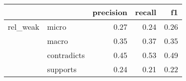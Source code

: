 \begin{tabular}{llrrr}
\toprule
         &          &  precision &  recall &   f1 \\
\midrule
rel\_weak & micro &       0.27 &    0.24 & 0.26 \\
         & macro &       0.35 &    0.37 & 0.35 \\
         & contradicts &       0.45 &    0.53 & 0.49 \\
         & supports &       0.24 &    0.21 & 0.22 \\
\bottomrule
\end{tabular}

